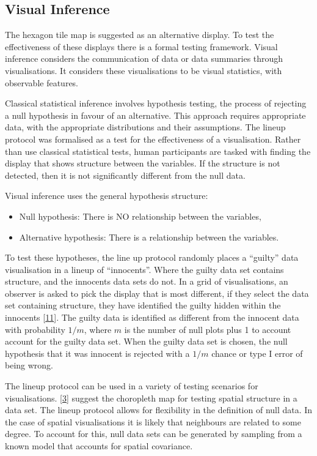\documentclass[conference,final,]{IEEEtran}
\begin{document}
\hypertarget{visual-inference}{%
\subsection{Visual Inference}\label{visual-inference}}

The hexagon tile map is suggested as an alternative display. To test the effectiveness of these displays there is a formal testing framework. Visual inference considers the communication of data or data summaries through visualisations. It considers these visualisations to be visual statistics, with observable features.

Classical statistical inference involves hypothesis testing, the process of rejecting a null hypothesis in favour of an alternative. This approach requires appropriate data, with the appropriate distributions and their assumptions.
The lineup protocol was formalised as a test for the effectiveness of a visualisation. Rather than use classical statistical tests, human participants are tasked with finding the display that shows structure between the variables. If the structure is not detected, then it is not significantly different from the null data.

Visual inference uses the general hypothesis structure:

\begin{itemize}
\item
  Null hypothesis: There is NO relationship between the variables,
\item
  Alternative hypothesis: There is a relationship between the variables.
\end{itemize}

To test these hypotheses, the line up protocol randomly places a ``guilty'' data visualisation in a lineup of ``innocents''. Where the guilty data set contains structure, and the innocents data sets do not.
In a grid of visualisations, an observer is asked to pick the display that is most different, if they select the data set containing structure, they have identified the guilty hidden within the innocents {[}\protect\hyperlink{ref-GTPCCD}{11}{]}.
The guilty data is identified as different from the innocent data with probability \(1/m\), where \(m\) is the number of null plots plus 1 to account account for the guilty data set. When the guilty data set is chosen, the null hypothesis that it was innocent is rejected with a \(1/m\) chance or type I error of being wrong.

The lineup protocol can be used in a variety of testing scenarios for visualisations. {[}\protect\hyperlink{ref-GIIV}{3}{]} suggest the choropleth map for testing spatial structure in a data set. The lineup protocol allows for flexibility in the definition of null data. In the case of spatial visualisations it is likely that neighbours are related to some degree. To account for this, null data sets can be generated by sampling from a known model that accounts for spatial covariance.
\end{document}
